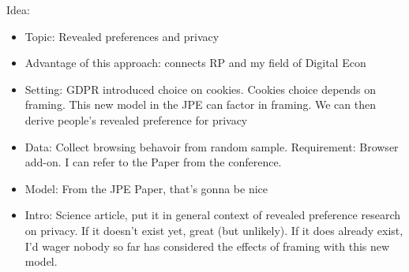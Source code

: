 Idea: 
\begin{itemize}
    \item Topic: Revealed preferences and privacy
    \item Advantage of this approach: connects RP and my field of Digital Econ
    \item Setting: GDPR introduced choice on cookies. Cookies choice depends on framing. This new model in the JPE can factor in framing. We can then derive people's revealed preference for privacy
    \item Data: Collect browsing behavoir from random sample. Requirement: Browser add-on. I can refer to the Paper from the conference.
    \item Model: From the JPE Paper, that's gonna be nice
    \item Intro: Science article, put it in general  context of revealed preference research on privacy. If it doesn't exist yet, great (but unlikely). If it does already exist, I'd wager nobody so far has considered the effects of framing with this new model.
\end{itemize}